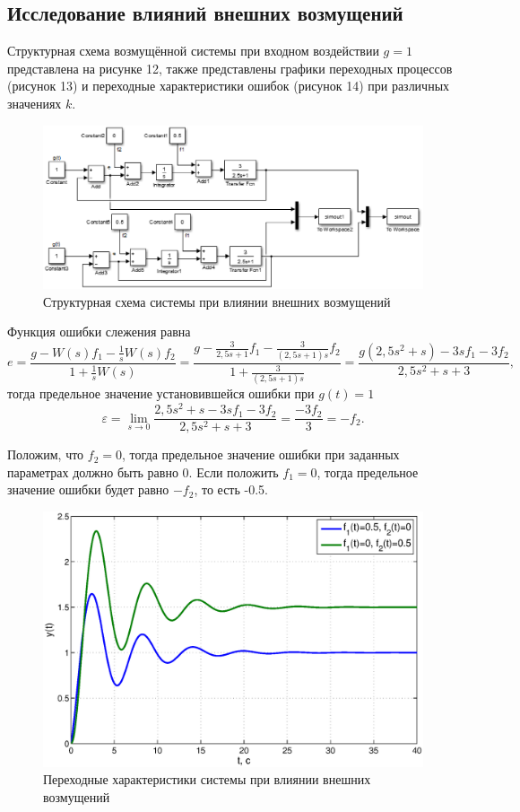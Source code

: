 \documentclass[12pt,a4paper]{article}
\begin{document}
\newpage
\begin{center}
\section{Исследование влияний внешних возмущений}
\end{center}\par
Структурная схема возмущённой системы при входном воздействии $g=1$ представлена на рисунке 12, также представлены графики переходных процессов (рисунок 13) и переходные характеристики ошибок (рисунок 14) при различных значениях $k$.
\begin{figure}[H]
    \centering
    \includegraphics[width=0.8\linewidth]{cxema3.eps}
    \caption{Структурная схема системы при влиянии внешних возмущений}
\end{figure}
Функция ошибки слежения равна
\begin{equation}
e = \frac{g - W(s)f_1 - \displaystyle{\frac{1}{s}}W(s)f_2}{1 + \displaystyle{\frac{1}{s}}W(s)} = \frac{g - \displaystyle{\frac{3}{2,5s + 1}}f_1 - \displaystyle{\frac{3}{(2,5s + 1)s}}f_2}{1 + \displaystyle{\frac{3}{(2,5s + 1)s}}} = \frac{g(2,5s^2 + s) - 3sf_1 - 3f_2}{2,5s^2 + s + 3},
\end{equation}
тогда предельное значение установившейся ошибки при $g(t) = 1$
\begin{equation}
\varepsilon = \lim_{s \to 0} \frac{2,5s^2 + s - 3sf_1 - 3f_2}{2,5s^2 + s + 3} = \frac{-3f_2}{3} = -f_2.
\end{equation}\par
Положим, что $f_2=0$, тогда предельное значение ошибки при заданных параметрах должно быть равно 0. Если положить  $f_1=0$, тогда предельное значение ошибки будет равно $-f_2$, то есть -0.5.
\begin{figure}[H]
    \centering
    \includegraphics[width=1\linewidth]{3.1.eps}
    \caption{Переходные характеристики системы при влиянии внешних возмущений}
\end{figure}
\end{document}
